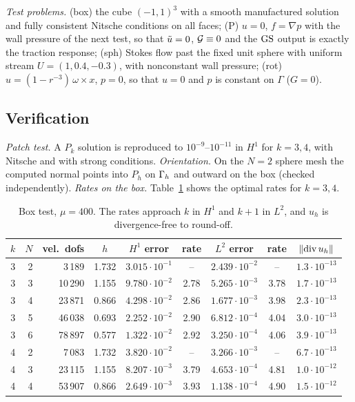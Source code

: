 \emph{Test problems.} (box) the cube $(-1,1)^3$ with a smooth manufactured solution and fully consistent Nitsche conditions on all faces; (P) $u=0$, $f=\nabla p$ with the wall pressure of the next test, so that $\tilde u=0$, $\mathcal G\equiv0$ and the $\mathrm{GS}$ output is exactly the traction response; (sph) Stokes flow past the fixed unit sphere with uniform stream $U=(1,0.4,-0.3)$, with nonconstant wall pressure; (rot) $u=(1-r^{-3})\,\omega\times x$, $p=0$, so that $u=0$ and $p$ is constant on $\Gamma$ ($G=0$).

\subsection{Verification}
\emph{Patch test.} A $P_k$ solution is reproduced to $10^{-9}$--$10^{-11}$ in $H^1$ for $k=3,4$, with Nitsche and with strong conditions. \emph{Orientation.} On the $N=2$ sphere mesh the computed normal points into $P_h$ on $\Gamma_h$ and outward on the box (checked independently). \emph{Rates on the box.} Table~\ref{tab:box} shows the optimal rates for $k=3,4$.

\begin{table}[ht]
\centering\small
\caption{Box test, $\mu=400$. The rates approach $k$ in $H^1$ and $k+1$ in $L^2$, and $u_h$ is divergence-free to round-off.}\label{tab:box}
\begin{tabular}{rrrcccccc}
\toprule
$k$ & $N$ & vel.\ dofs & $h$ & $H^1$ error & rate & $L^2$ error & rate & $\lVert \operatorname{div} u_h\rVert$\\
\midrule
3&2&3\,189&1.732&$3.015\cdot10^{-1}$&--&$2.439\cdot10^{-2}$&--&$1.3\cdot10^{-13}$\\
3&3&10\,290&1.155&$9.780\cdot10^{-2}$&2.78&$5.265\cdot10^{-3}$&3.78&$1.7\cdot10^{-13}$\\
3&4&23\,871&0.866&$4.298\cdot10^{-2}$&2.86&$1.677\cdot10^{-3}$&3.98&$2.3\cdot10^{-13}$\\
3&5&46\,038&0.693&$2.252\cdot10^{-2}$&2.90&$6.812\cdot10^{-4}$&4.04&$3.0\cdot10^{-13}$\\
3&6&78\,897&0.577&$1.322\cdot10^{-2}$&2.92&$3.250\cdot10^{-4}$&4.06&$3.9\cdot10^{-13}$\\
4&2&7\,083&1.732&$3.820\cdot10^{-2}$&--&$3.266\cdot10^{-3}$&--&$6.7\cdot10^{-13}$\\
4&3&23\,115&1.155&$8.207\cdot10^{-3}$&3.79&$4.653\cdot10^{-4}$&4.81&$1.0\cdot10^{-12}$\\
4&4&53\,907&0.866&$2.649\cdot10^{-3}$&3.93&$1.138\cdot10^{-4}$&4.90&$1.5\cdot10^{-12}$\\
\bottomrule
\end{tabular}
\end{table}

